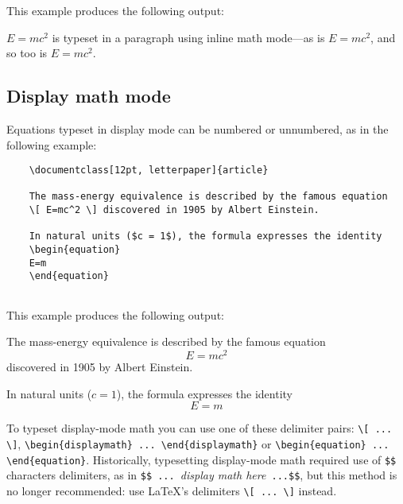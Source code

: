 This example produces the following output:

\begin{mdframed}
    \-\hspace{20pt}\begin{math}
    E=mc^2
    \end{math} is typeset in a paragraph using inline math mode---as is $E=mc^2$, and so too is \(E=mc^2\).
\end{mdframed}

\subsection{Display math mode}

Equations typeset in display mode can be numbered or unnumbered, as in the following example:

\begin{tcolorbox}
\begin{verbatim}
    \documentclass[12pt, letterpaper]{article}
    
    The mass-energy equivalence is described by the famous equation
    \[ E=mc^2 \] discovered in 1905 by Albert Einstein. 

    In natural units ($c = 1$), the formula expresses the identity
    \begin{equation}
    E=m
    \end{equation}
    
\end{verbatim}
\end{tcolorbox}

This example produces the following output:

\begin{mdframed}
    \-\hspace{20pt}The mass-energy equivalence is described by the famous equation
    \[ E=mc^2 \] discovered in 1905 by Albert Einstein. 

    \-\hspace{20pt}In natural units ($c = 1$), the formula expresses the identity
    \begin{equation}
    E=m
    \end{equation}
\end{mdframed}

To typeset display-mode math you can use one of these delimiter pairs: \verb|\[ ... \]|, \verb|\begin{displaymath} ... \end{displaymath}| or \verb|\begin{equation} ...|\\ \verb|\end{equation}|. Historically, typesetting display-mode math required use of \verb|$$| characters delimiters, as in \verb|$$ ... |\emph{display math here}\verb| ...$$|, but this method is no longer recommended: use LaTeX’s delimiters \verb|\[ ... \]| instead.

